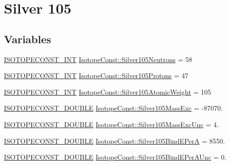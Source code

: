 \hypertarget{group___isotope_const-_silver-_ag105}{}\section{Silver 105}
\label{group___isotope_const-_silver-_ag105}
\subsection*{Variables}
\begin{DoxyCompactItemize}
\item 
\mbox{\hyperlink{group___isotope_const-_macros_ga5f18360b3e99483a35c32d789e62621c}{I\+S\+O\+T\+O\+P\+E\+C\+O\+N\+S\+T\+\_\+\+I\+NT}} \mbox{\hyperlink{group___isotope_const-_silver-_ag105_gae26c9d9d303bd324df5fae01cbc95d75}{Isotope\+Const\+::\+Silver105\+Neutrons}} = 58
\item 
\mbox{\hyperlink{group___isotope_const-_macros_ga5f18360b3e99483a35c32d789e62621c}{I\+S\+O\+T\+O\+P\+E\+C\+O\+N\+S\+T\+\_\+\+I\+NT}} \mbox{\hyperlink{group___isotope_const-_silver-_ag105_ga3180a1749374f19c8df6e88fcec707b1}{Isotope\+Const\+::\+Silver105\+Protons}} = 47
\item 
\mbox{\hyperlink{group___isotope_const-_macros_ga5f18360b3e99483a35c32d789e62621c}{I\+S\+O\+T\+O\+P\+E\+C\+O\+N\+S\+T\+\_\+\+I\+NT}} \mbox{\hyperlink{group___isotope_const-_silver-_ag105_ga0dad78151180fefe785e7ad741dc7557}{Isotope\+Const\+::\+Silver105\+Atomic\+Weight}} = 105
\item 
\mbox{\hyperlink{group___isotope_const-_macros_ga8f45a7272ce02c0b4c65c44636ed719a}{I\+S\+O\+T\+O\+P\+E\+C\+O\+N\+S\+T\+\_\+\+D\+O\+U\+B\+LE}} \mbox{\hyperlink{group___isotope_const-_silver-_ag105_gaebb7a2e825b841b8d2c25c24cf08e49f}{Isotope\+Const\+::\+Silver105\+Mass\+Exc}} = -\/87070.
\item 
\mbox{\hyperlink{group___isotope_const-_macros_ga8f45a7272ce02c0b4c65c44636ed719a}{I\+S\+O\+T\+O\+P\+E\+C\+O\+N\+S\+T\+\_\+\+D\+O\+U\+B\+LE}} \mbox{\hyperlink{group___isotope_const-_silver-_ag105_ga3d611c8d8a7baeff85e5d5b6eef0a1f8}{Isotope\+Const\+::\+Silver105\+Mass\+Exc\+Unc}} = 4.
\item 
\mbox{\hyperlink{group___isotope_const-_macros_ga8f45a7272ce02c0b4c65c44636ed719a}{I\+S\+O\+T\+O\+P\+E\+C\+O\+N\+S\+T\+\_\+\+D\+O\+U\+B\+LE}} \mbox{\hyperlink{group___isotope_const-_silver-_ag105_ga6697497a158fdaa0dfb71467b5838980}{Isotope\+Const\+::\+Silver105\+Bind\+E\+PerA}} = 8550.
\item 
\mbox{\hyperlink{group___isotope_const-_macros_ga8f45a7272ce02c0b4c65c44636ed719a}{I\+S\+O\+T\+O\+P\+E\+C\+O\+N\+S\+T\+\_\+\+D\+O\+U\+B\+LE}} \mbox{\hyperlink{group___isotope_const-_silver-_ag105_ga607814b3b947f523454f82d63713a098}{Isotope\+Const\+::\+Silver105\+Bind\+E\+Per\+A\+Unc}} = 0.

\end{DoxyCompactItemize}

